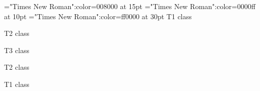 \font\tctbta="Times New Roman":color=008000 at 15pt
\font\tbta="Times New Roman":color=0000ff at 10pt
\font\ta="Times New Roman":color=ff0000 at 30pt
\ta T1 class 

\tbta T2 class 

\tctbta T3 class 

\tbta T2 class 

\ta T1 class 


\bye
